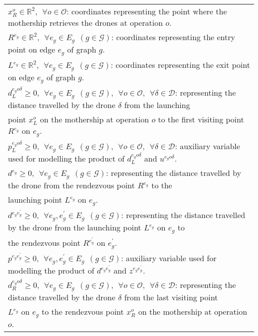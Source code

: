 \begin{table}[h!]
\begin{tabular}{|l|}
$x_R^o\in\mathbb R^2, \:\: \forall o \in \mathcal O$: coordinates representing the point where the mothership retrieves the drones at operation $o$.\\
$R^{e_g}\in\mathbb R^2, \:\: \forall e_g \in E_g\:\: (g \in \mathcal{G})$: coordinates representing the entry point on edge $e_g$ of graph $g$.\\
$L^{e_g}\in\mathbb R^2, \:\: \forall e_g \in E_g\:\: (g \in \mathcal{G})$: coordinates representing the exit point on edge $e_g$ of graph $g$.\\
$d_L^{e_go\delta} \geq 0, \:\: \forall e_g \in E_g\:\: (g \in \mathcal{G}),\:\: \forall o \in \mathcal O, \:\: \forall \delta\in\mathcal D$: representing the distance travelled by the drone $\delta$ from the launching\\
\hspace*{1cm} point $x_L^o$ on the mothership at operation $o$ to the first visiting point $R^{e_g}$ on $e_g$.\\
$p_L^{e_go\delta} \geq 0, \:\: \forall e_g \in E_g\:\: (g \in \mathcal{G}), \:\:\forall o \in \mathcal O, \:\:\forall \delta\in\mathcal D$: auxiliary variable used for modelling the product of $d_L^{e_go\delta}$ and $u^{e_go\delta}$.\\
$d^{e_g} \geq 0, \:\: \forall e_g \in E_g \:\: (g \in \mathcal{G})$: representing the distance travelled by the drone from the rendezvous point $R^{e_g}$ to the \\
\hspace*{1cm} launching point $L^{e_g}$ on $e_g$. \\
$d^{e_ge^\prime_g} \geq 0, \:\: \forall e_g, e^\prime_g \in E_g \:\: (g \in \mathcal{G})$: representing the distance travelled by the drone from the launching point $L^{e_g}$ on $e_g$ to\\
\hspace*{1cm}  the rendezvous point $R^{e^\prime_g}$ on $e^\prime_g$.\\
$p^{e_ge^\prime_g} \geq 0, \:\: \forall e_g, e^\prime_g \in E_g \:\: (g \in \mathcal{G})$: auxiliary variable used for modelling the product of $d^{e_ge^\prime_g}$ and $z^{e_ge^\prime_g}$.\\
$d_R^{e_go\delta} \geq 0, \:\: \forall e_g \in E_g\:\: (g \in \mathcal{G}), \:\: \forall o \in \mathcal O, \:\:\forall \delta\in\mathcal D$: representing the distance travelled by the drone $\delta$ from the last visiting point\\
\hspace*{1cm} $L^{e_g}$ on $e_g$ to the rendezvous point $x_R^o$ on the mothership at operation $o$.\\

\end{tabular}
\end{table}

